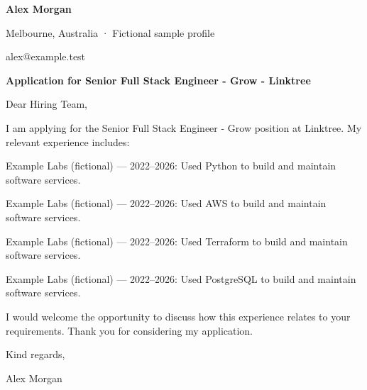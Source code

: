 \documentclass[10pt,a4paper]{article}
\begin{document}
{\LARGE\bfseries\color{navy} Alex Morgan}\par
Melbourne, Australia · Fictional sample profile\par
alex@example.test\par
{\large\bfseries\color{navy} Application for Senior Full Stack Engineer - Grow - Linktree}\par
Dear Hiring Team,\par
I am applying for the Senior Full Stack Engineer - Grow position at Linktree. My relevant experience includes:\par
Example Labs (fictional) — 2022–2026: Used Python to build and maintain software services.\par
Example Labs (fictional) — 2022–2026: Used AWS to build and maintain software services.\par
Example Labs (fictional) — 2022–2026: Used Terraform to build and maintain software services.\par
Example Labs (fictional) — 2022–2026: Used PostgreSQL to build and maintain software services.\par
I would welcome the opportunity to discuss how this experience relates to your requirements. Thank you for considering my application.\par
Kind regards,\par
Alex Morgan\par
\end{document}

